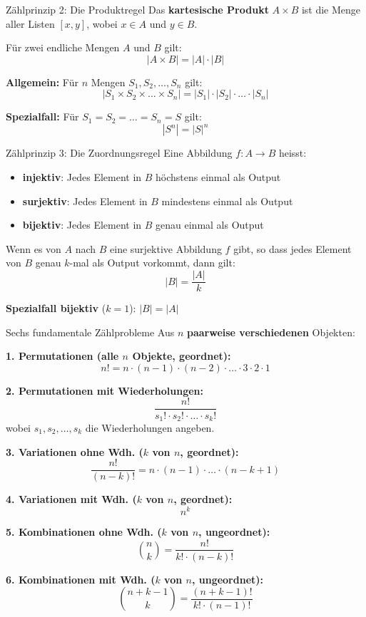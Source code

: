 \documentclass[a4paper, fontsize=7pt]{scrartcl}
\begin{document}
\begin{mainbox}{Zählprinzip 2: Die Produktregel}
Das \textbf{kartesische Produkt} $A \times B$ ist die Menge aller Listen $[x, y]$, wobei $x \in A$ und $y \in B$.

Für zwei endliche Mengen $A$ und $B$ gilt:
$$|A \times B| = |A| \cdot |B|$$

\textbf{Allgemein:} Für $n$ Mengen $S_1, S_2, \ldots, S_n$ gilt:
$$|S_1 \times S_2 \times \ldots \times S_n| = |S_1| \cdot |S_2| \cdot \ldots \cdot |S_n|$$

\textbf{Spezialfall:} Für $S_1 = S_2 = \ldots = S_n = S$ gilt:
$$|S^n| = |S|^n$$
\end{mainbox}

\begin{mainbox}{Zählprinzip 3: Die Zuordnungsregel}
Eine Abbildung $f: A \to B$ heisst:
\begin{itemize}
    \item \textbf{injektiv}: Jedes Element in $B$ höchstens einmal als Output
    \item \textbf{surjektiv}: Jedes Element in $B$ mindestens einmal als Output
    \item \textbf{bijektiv}: Jedes Element in $B$ genau einmal als Output
\end{itemize}

Wenn es von $A$ nach $B$ eine surjektive Abbildung $f$ gibt, so dass jedes Element von $B$ genau $k$-mal als Output vorkommt, dann gilt:
$$|B| = \frac{|A|}{k}$$

\textbf{Spezialfall bijektiv} ($k=1$): $|B| = |A|$
\end{mainbox}

\begin{mainbox}{Sechs fundamentale Zählprobleme}
Aus $n$ \textbf{paarweise verschiedenen} Objekten:

\textbf{1. Permutationen (alle $n$ Objekte, geordnet):}
$$n! = n \cdot (n-1) \cdot (n-2) \cdot \ldots \cdot 3 \cdot 2 \cdot 1$$

\textbf{2. Permutationen mit Wiederholungen:}
$$\frac{n!}{s_1! \cdot s_2! \cdot \ldots \cdot s_k!}$$
wobei $s_1, s_2, \ldots, s_k$ die Wiederholungen angeben.

\textbf{3. Variationen ohne Wdh. ($k$ von $n$, geordnet):}
$$\frac{n!}{(n-k)!} = n \cdot (n-1) \cdot \ldots \cdot (n-k+1)$$

\textbf{4. Variationen mit Wdh. ($k$ von $n$, geordnet):}
$$n^k$$

\textbf{5. Kombinationen ohne Wdh. ($k$ von $n$, ungeordnet):}
$$\binom{n}{k} = \frac{n!}{k! \cdot (n-k)!}$$

\textbf{6. Kombinationen mit Wdh. ($k$ von $n$, ungeordnet):}
$$\binom{n+k-1}{k} = \frac{(n+k-1)!}{k! \cdot (n-1)!}$$
\end{mainbox}
\end{document}
